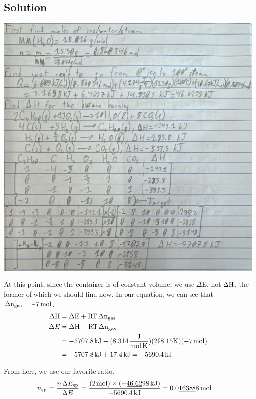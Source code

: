 \documentclass[10pt]{article}
\newcommand{\U}[1]{\underline{#1}}
\begin{document}
        \subsection{Solution}
            \begin{center}
                \includegraphics[width=\textwidth]{Answers Images/D30-1.jpg}
            \end{center}
            At this point, since the container is of constant volume, we use $\Delta$E, not $\rm\Delta H$, the former of which we should find now. 
            In our equation, we can see that $\rm \Delta n_{gas} = -7\,\unit{\mole}$. 
            \begin{align}
                \rm
                \Delta H    &=  \rm \Delta E + RT\,\Delta n_{gas}\\
                \Delta E    &=  \rm \Delta H - RT\,\Delta n_{gas}\\
                    &=  -5707.8\,\unit{\kilo\joule} - (8.314\,\unit{\frac{\joule}{\mole\,\kelvin}}) (298.15\unit{\kelvin}) (-7\,\unit{\mole})\\
                    &=  -5707.8\,\unit{\kilo\joule} + 17.4\,\unit{\kilo\joule}
                    =   -5690.4\,\unit{\kilo\joule}
            \end{align}

            From here, we use our favorite ratio.
            \begin{align}
                n_{\rm sp}  &=  \frac{n\,\Delta E_{\rm sp}}{\Delta E}
                    =   \frac{(2\,\unit{\mole}) \times (-\U{46.62}98\,\unit{\kilo\joule})}{-5690.4\,\unit{\kilo\joule}}
                    =   0.0\U{16388}8\,\unit{\mole}
            \end{align}
\end{document}
